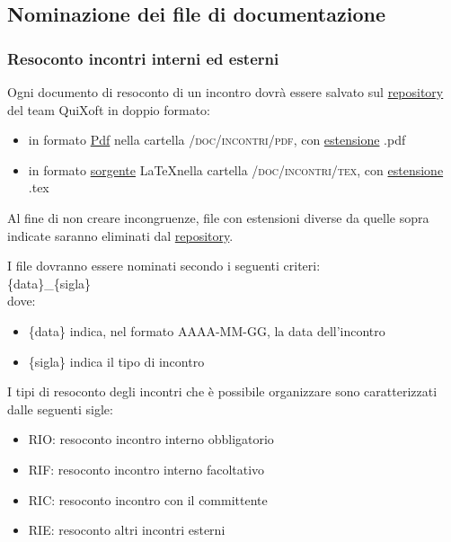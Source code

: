 \documentclass[11pt,a4paper]{article}
\begin{document}
\subsection{Nominazione dei file di documentazione}
\subsubsection{Resoconto incontri interni ed esterni}
Ogni documento di resoconto di un incontro dovrà essere salvato sul \underline{repository} del team QuiXoft in doppio formato:
\begin{itemize}
	\item in formato \underline{Pdf} nella cartella \textsc{/doc/incontri/pdf}, con \underline{estensione} .pdf
	\item in formato \underline{sorgente} \LaTeX \space nella cartella \textsc{/doc/incontri/tex}, con \underline{estensione} .tex
\end{itemize}
Al fine di non creare incongruenze, file con estensioni diverse da quelle sopra indicate saranno eliminati dal \underline{repository}.

I file dovranno essere nominati secondo i seguenti criteri: \\

\{data\}\_\{sigla\} \\

dove:

\begin{itemize}
	\item \{data\} indica, nel formato AAAA-MM-GG, la data dell'incontro
	\item \{sigla\} indica il tipo di incontro
\end{itemize}
\bigskip \medskip
I tipi di resoconto degli incontri che è possibile organizzare sono caratterizzati dalle seguenti sigle:

\begin{itemize}
	\item RIO: resoconto incontro interno obbligatorio
	\item RIF: resoconto incontro interno facoltativo
	\item RIC: resoconto incontro con il committente
	\item RIE: resoconto altri incontri esterni
\end{itemize}
\end{document}
